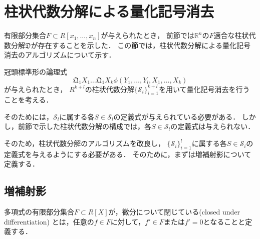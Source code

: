 \documentclass[uplatex, dvipdfmx]{jsarticle}
\newcommand{\R}{\mathbb{R}}
\newcommand{\Qua}{\mathfrak{Q}}
\newcommand{\calS}{\mathcal{S}}
\theoremstyle{definition}
\newtheorem{definition}{定義}[section]
\begin{document}



\section{柱状代数分解による量化記号消去}
有限部分集合$F \subset R[x_1, \dots, x_n]$が与えられたとき，
前節では$\R^n$の$F$適合な柱状代数分解$\mathfrak{D}$が存在することを示した．
この節では，柱状代数分解による量化記号消去のアルゴリズムについて示す．

冠頭標準形の論理式
\[
     \Qua_1 X_1 \dots \Qua_1 X_k \phi(Y_1, \dots, Y_l, X_1, \dots, X_k)
\]
が与えられたとき，
$R^{k+l}$の柱状代数分解$\{\calS_i\}_{i=1}^{k+l}$を用いて量化記号消去を行うことを考える．

そのためには，$\calS_l$に属する各$S \in \calS_l$の定義式が与えられている必要がある．
しかし，前節で示した柱状代数分解の構成では，各$S \in \calS_l$の定義式は与えられない．

そのため，柱状代数分解のアルゴリズムを改良し，
$\{\calS_i\}_{i=1}^l$に属する各$S \in \calS_i$の定義式を与えるようにする必要がある．
そのために，まずは増補射影について定義する．

\subsection{増補射影}
     多項式の有限部分集合$F \subset R[X]$が，微分について閉じている(closed under differentiation)
     とは，任意の$f \in F$に対して，$f' \in F$または$f'=0$となることと定義する．
\end{document}
